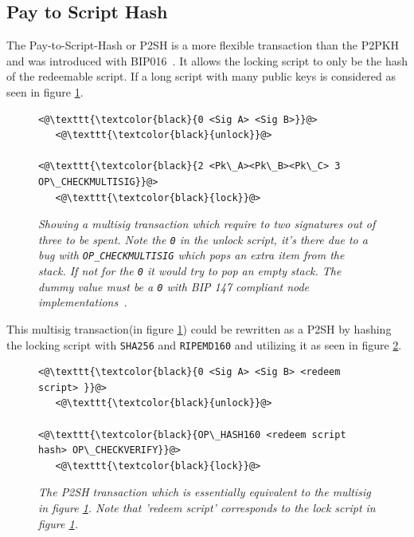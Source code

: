 \subsection{Pay to Script Hash}

The Pay-to-Script-Hash or P2SH is a more flexible transaction than the P2PKH and was introduced with BIP016~\cite{bip:0016:p2sh}. It allows the locking script to only be the hash of the redeemable script. If a long script with many public keys is considered as seen in figure \ref{fig:cumbersome:script}.

\newpage

\begin{figure}
	\centering
	\begin{lstlisting}
<@\texttt{\textcolor{black}{0 <Sig A> <Sig B>}}@>   
   <@\texttt{\textcolor{black}{unlock}}@>
	
<@\texttt{\textcolor{black}{2 <Pk\_A><Pk\_B><Pk\_C> 3 OP\_CHECKMULTISIG}}@>
   <@\texttt{\textcolor{black}{lock}}@>
	\end{lstlisting}
	
	\caption{\textit{ Showing a multisig transaction which require to two signatures out of three to be spent. Note the \texttt{0} in the unlock script, it's there due to a bug with \texttt{OP\_CHECKMULTISIG} which pops an extra item from the stack. If not for the \texttt{0} it would try to pop an empty stack. The dummy value must be a \texttt{0} with BIP 147 compliant node implementations~\cite{bip:0147:dummy:zero}.
	}}
	\label{fig:cumbersome:script}
\end{figure} 

This multisig transaction(in figure \ref{fig:cumbersome:script}) could be rewritten as a P2SH by hashing the locking script with \texttt{SHA256} and  \texttt{RIPEMD160} and utilizing it as seen in figure \ref{fig:p2sh}.

\begin{figure}[hbt!]
	
	\begin{lstlisting}
<@\texttt{\textcolor{black}{0 <Sig A> <Sig B> <redeem script> }}@>   
   <@\texttt{\textcolor{black}{unlock}}@>
	
<@\texttt{\textcolor{black}{OP\_HASH160 <redeem script hash> OP\_CHECKVERIFY}}@>
   <@\texttt{\textcolor{black}{lock}}@>
	\end{lstlisting}
	
	\caption{\textit{ The P2SH transaction which is essentially equivalent to the multisig in figure \ref{fig:cumbersome:script}.
			Note that 'redeem script' corresponds to the lock script in figure \ref{fig:cumbersome:script}.
	}}
	\label{fig:p2sh}
\end{figure}

